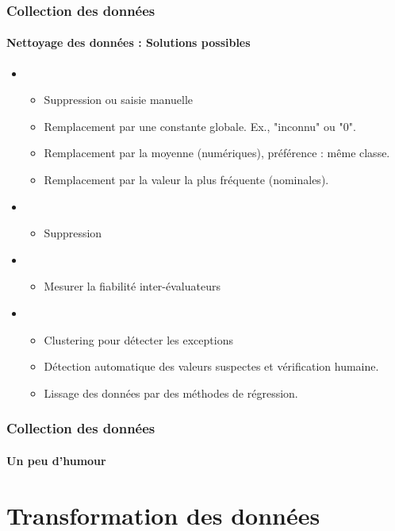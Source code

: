\documentclass[xcolor=table]{beamer}
\begin{document}
\begin{frame}
	\frametitle{Collection des données}
	\framesubtitle{Nettoyage des données : Solutions possibles}
	
	\begin{itemize}
		\item {}
		\begin{itemize}
			\item Suppression ou saisie manuelle
			\item Remplacement par une constante globale. Ex., "inconnu" ou "0".
			\item Remplacement par la moyenne (numériques), préférence : même classe.
			\item Remplacement par la valeur la plus fréquente (nominales).
		\end{itemize}
		\item {}
		\begin{itemize}
			\item Suppression
		\end{itemize}
		\item {}
		\begin{itemize}
			\item Mesurer la fiabilité inter-évaluateurs
		\end{itemize}
		\item {} 
		\begin{itemize}
			\item Clustering pour détecter les exceptions
			\item Détection automatique des valeurs suspectes et vérification humaine.
			\item Lissage des données par des méthodes de régression.
		\end{itemize}
	\end{itemize}
	
\end{frame}

\begin{frame}
	\frametitle{Collection des données}
	\framesubtitle{Un peu d'humour}
	
	\begin{center}
	\end{center}
	
\end{frame}

\section{Transformation des données}
\end{document}
